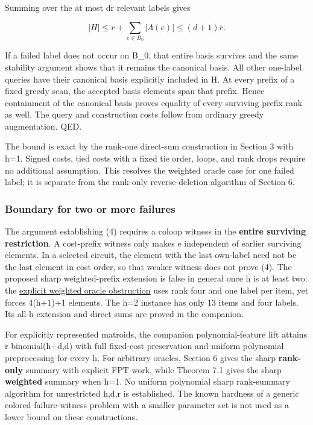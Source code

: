 Summing over the at most dr relevant labels gives

\[
|H|\le r+\sum_{e\in B_0}|\Lambda(e)|\le(d+1)r.
\]

If a failed label does not occur on B\_0, that entire basis survives and the same stability argument shows that it remains the canonical basis. All other one-label queries have their canonical basis explicitly included in H. At every prefix of a fixed greedy scan, the accepted basis elements span that prefix. Hence containment of the canonical basis proves equality of every surviving prefix rank as well. The query and construction costs follow from ordinary greedy augmentation. QED.

The bound is exact by the rank-one direct-sum construction in Section 3 with h=1. Signed costs, tied costs with a fixed tie order, loops, and rank drops require no additional assumption. This resolves the weighted oracle case for one failed label; it is separate from the rank-only reverse-deletion algorithm of Section 6.

\hypertarget{af-4c0863a692-boundary-for-two-or-more-failures}{%
\subsubsection{Boundary for two or more failures}\label{af-4c0863a692-boundary-for-two-or-more-failures}}

The argument establishing (4) requires a coloop witness in the \textbf{entire surviving restriction}. A cost-prefix witness only makes e independent of earlier surviving elements. In a selected circuit, the element with the last own-label need not be the last element in cost order, so that weaker witness does not prove (4). The proposed sharp weighted-prefix extension is false in general once h is at least two: the \href{https://github.com/icekylinx/algorithm-frontier/blob/main/problems/matroid-failure-summaries/manuscripts/weighted-oracle-two-failure-obstruction.md}{explicit weighted oracle obstruction} uses rank four and one label per item, yet forces 4(h+1)+1 elements. The h=2 instance has only 13 items and four labels. Its all-h extension and direct sums are proved in the companion.

For explicitly represented matroids, the companion polynomial-feature lift attains r binomial(h+d,d) with full fixed-cost preservation and uniform polynomial preprocessing for every h. For arbitrary oracles, Section 6 gives the sharp \textbf{rank-only} summary with explicit FPT work, while Theorem 7.1 gives the sharp \textbf{weighted} summary when h=1. No uniform polynomial sharp rank-summary algorithm for unrestricted h,d,r is established. The known hardness of a generic colored failure-witness problem with a smaller parameter set is not used as a lower bound on these constructions.

